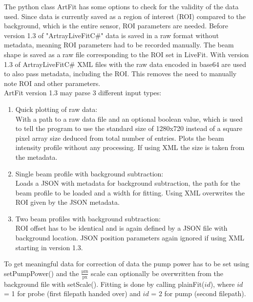 \documentclass[twoside,openright,listof=numbered]{scrreprt}
\begin{document}
The python class ArtFit has some options to check for the validity of the data used. Since data is currently saved as a region of interest (ROI) compared to the background, which is the entire sensor, ROI parameters are needed. Before version 1.3 of "ArtrayLiveFitC\#" data is saved in a raw format without metadata, meaning ROI parameters had to be recorded manually.  The beam shape is saved as a raw file corresponding to the ROI set in LiveFit. With version 1.3 of ArtrayLiveFitC\# XML files with the raw data encoded in base64 are used to also pass metadata, including the ROI. This removes the need to manually note ROI and other parameters.\\
ArtFit version 1.3 may parse 3 different input types:
\begin{enumerate}
\item Quick plotting of raw data:\\
With a path to a raw data file and an optional boolean value, which is used to tell the program to use the standard size of 1280x720 instead of a square pixel array size deduced from total number of entries. Plots the beam intensity profile without any processing. If using XML the size is taken from the metadata.
\item Single beam profile with background subtraction: \\
Loads a JSON with metadata for background subtraction, the path for the beam profile to be loaded and a width for fitting. Using XML overwrites the ROI given by the JSON metadata.
\item Two beam profiles with background subtraction: \\
ROI offset has to be identical and is again defined by a JSON file with background location. JSON position parameters again ignored if using XML starting in version 1.3.
\end{enumerate}

To get meaningful data for correction of data the pump power has to be set using setPumpPower() and the $\mathrm{\frac{\si{\micro\meter}}{px}}$ scale can optionally be overwritten from the background file with setScale(). Fitting is done by calling plainFit($id$), where $id$ = 1 for probe (first filepath handed over) and $id$ = 2 for pump (second filepath).
\end{document}

